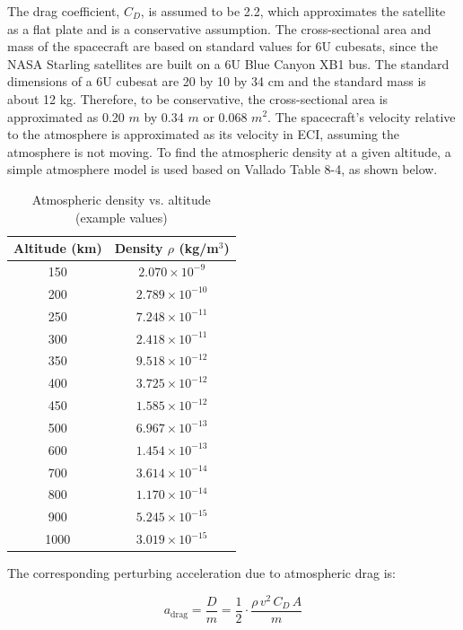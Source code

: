 The drag coefficient, $C_D$, is assumed to be 2.2, which approximates the satellite as a flat plate and is a conservative assumption. The cross-sectional area and mass of the spacecraft are based on standard values for 6U cubesats, since the NASA Starling satellites are built on a 6U Blue Canyon XB1 bus. \cite{miller2024starling} The standard dimensions of a 6U cubesat are 20 by 10 by 34 cm and the standard mass is about 12 kg. \cite{cubesatSpec} Therefore, to be conservative, the cross-sectional area is approximated as 0.20 $m$ by 0.34 $m$ or 0.068 $m^2$. The spacecraft's velocity relative to the atmosphere is approximated as its velocity in ECI, assuming the atmosphere is not moving. To find the atmospheric density at a given altitude, a simple atmosphere model is used based on Vallado Table 8-4, as shown below.\cite{book:Vallado}

\begin{table}[H]
\centering
\begin{tabular}{|c|c|}
\hline
\textbf{Altitude (km)} & \textbf{Density $\rho$ (kg/m$^3$)} \\
\hline
150  & $2.070 \times 10^{-9}$ \\
200  & $2.789 \times 10^{-10}$ \\
250  & $7.248 \times 10^{-11}$ \\
300  & $2.418 \times 10^{-11}$ \\
350  & $9.518 \times 10^{-12}$ \\
400  & $3.725 \times 10^{-12}$ \\
450  & $1.585 \times 10^{-12}$ \\
500  & $6.967 \times 10^{-13}$ \\
600  & $1.454 \times 10^{-13}$ \\
700  & $3.614 \times 10^{-14}$ \\
800  & $1.170 \times 10^{-14}$ \\
900  & $5.245 \times 10^{-15}$ \\
1000 & $3.019 \times 10^{-15}$ \\
\hline
\end{tabular}
\caption{Atmospheric density vs. altitude (example values)}
\label{tab:atmospheric_density}
\end{table}

The corresponding perturbing acceleration due to atmospheric drag is:

\begin{equation}
    a_{\text{drag}} = \frac{D}{m} = \frac{1}{2} \cdot \frac{\rho \, v^2 \, C_D \, A}{m}
\end{equation}

